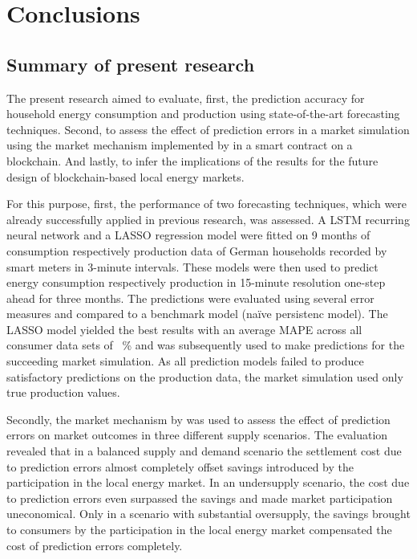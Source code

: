 
\section{Conclusions}\label{Sec:Conc}




\subsection{Summary of present research}\label{Sec:Conclusion;Subsec:Summary}

The present research aimed to evaluate, first, the prediction accuracy for household energy consumption and production using state-of-the-art forecasting techniques. Second, to assess the effect of prediction errors in a market simulation using the market mechanism implemented by \citet{Mengelkamp:2018a} in a smart contract on a blockchain. And lastly, to infer the implications of the results for the future design of blockchain-based local energy markets.

For this purpose, first, the performance of two forecasting techniques, which were already successfully applied in previous research, was assessed. A LSTM recurring neural network and a LASSO regression model were fitted on 9 months of consumption respectively production data of German households recorded by smart meters in 3-minute intervals. These models were then used to predict energy consumption respectively production in 15-minute resolution one-step ahead for three months. The predictions were evaluated using several error measures and compared to a benchmark model (na\"ive persistenc model). The LASSO model yielded the best results with an average MAPE across all consumer data sets of ~\% and was subsequently used to make predictions for the succeeding market simulation. As all prediction models failed to produce satisfactory predictions on the production data, the market simulation used only true production values.

Secondly, the market mechanism by \citet{Mengelkamp:2018a} was used to assess the effect of prediction errors on market outcomes in three different supply scenarios. The evaluation revealed that in a balanced supply and demand scenario the settlement cost due to prediction errors almost completely offset savings introduced by the participation in the local energy market. In an undersupply scenario, the cost due to prediction errors even surpassed the savings and made market participation uneconomical. Only in a scenario with substantial oversupply, the savings brought to consumers by the participation in the local energy market compensated the cost of prediction errors completely.

